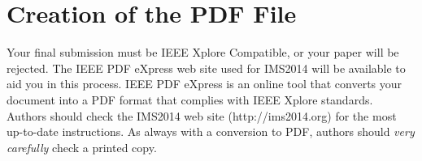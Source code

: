 \documentclass[conference]{IEEEtran}
\begin{document}
{\section{Creation of the PDF File}
Your final submission must be IEEE Xplore Compatible, or your paper will be rejected. The IEEE PDF eXpress web site used for IMS2014 will be available to aid you in this process. IEEE PDF eXpress is an online tool that converts your document into a PDF format that complies with IEEE Xplore\textsuperscript{\textregistered} standards. Authors should check the IMS2014 web site (http://ims2014.org) for the most up-to-date instructions.  As always with a conversion to PDF, authors should {\itshape very carefully} check a printed copy.






%


%



}
\end{document}
